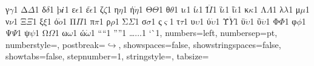 {		{γ}{{$\gamma$}}1 {Δ}{{$\Delta$}}1 {δ}{{$\delta$}}1 {þ}{{$\thorn$}}1
		{ε}{{$\epsilon$}}1 {έ}{{$\dot \epsilon$}}1 {ζ}{{$\zeta$}}1
		{η}{{$\eta$}}1 {ή}{{$\dot \eta$}}1 {Θ}{{$\Theta$}}1
		{θ}{{$\theta$}}1 {ι}{{$\iota$}}1 {ί}{{$\dot \iota$}}1
		{Ϊ}{{$\ddot I$}}1 {ϊ}{{$\ddot \iota$}}1 {ΐ}{{$\dddot \iota$}}1
		{κ}{{$\kappa$}}1 {Λ}{{$\Lambda$}}1 {λ}{{$\lambda$}}1
		{μ}{{$\mu$}}1 {ν}{{$\nu$}}1 {Ξ}{{$\Xi$}}1 {ξ}{{$\xi$}}1
		{ό}{{$\dot o$}}1 {Π}{{$\Pi$}}1 {π}{{$\pi$}}1 {ρ}{{$\rho$}}1
		{Σ}{{$\Sigma$}}1 {σ}{{$\sigma$}}1 {ς}{{$\varsigma$}}1 {τ}{{$\tau$}}1
		{υ}{{$\upsilon$}}1 {ύ}{{$\dot \upsilon$}}1 {Ϋ}{{$\ddot Y$}}1
		{ϋ}{{$\ddot \upsilon$}}1 {ΰ}{{$\dddot \upsilon$}}1
		{Φ}{{$\Phi$}}1 {φ}{{$\phi$}}1 {Ψ}{{$\Psi$}}1 {ψ}{{$\psi$}}1
		{Ω}{{$\Omega$}}1 {ω}{{$\omega$}}1 {ώ}{{$\dot \omega$}}1
		{“}{{``}}1 {”}{{''}}1 {…}{{$\ldots$}}1 {`}{\`}1,
	numbers=left,
	numbersep={\sourcecodenumbersep pt},
	numberstyle=\tiny\color{dkgray},
	postbreak=\mbox{$\hookrightarrow$\space},
	showspaces=false,
	showstringspaces=false,
	showtabs=false,
	stepnumber=1,
	stringstyle=\color{mauve},
	tabsize={\sourcecodetabsize}
}

